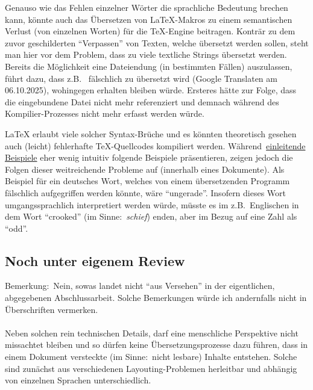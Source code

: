 Genauso wie das Fehlen einzelner Wörter die sprachliche Bedeutung brechen kann, könnte auch das Übersetzen von \LaTeX{}-Makros zu einem semantischen Verlust (von einzelnen Worten) für die \TeX{}-Engine beitragen. Konträr zu dem zuvor geschilderten \enquote{Verpassen} von Texten, welche übersetzt werden sollen, steht man hier vor dem Problem, dass zu viele textliche Strings übersetzt werden. Bereits die Möglichkeit eine Dateiendung (in bestimmten Fällen) auszulassen, führt dazu, dass z.B.\ \verb|| fälschlich zu \verb|| übersetzt wird (Google Translaten am 06.10.2025), wohingegen \verb|| erhalten bleiben würde. Ersteres hätte zur Folge, dass die eingebundene Datei nicht mehr referenziert und demnach während des Kompilier-Prozesses nicht mehr erfasst werden würde.\\\noindent 

\LaTeX{} erlaubt viele solcher Syntax-Brüche und es könnten theoretisch gesehen auch (leicht) fehlerhafte \TeX{}-Quellcodes kompiliert werden. Während~\hyperref[einleitung:hintergrund]{einleitende Beispiele} eher wenig intuitiv folgende Beispiele präsentieren, zeigen jedoch die Folgen dieser weitreichende Probleme auf (innerhalb eines Dokumente). Als Beispiel für ein deutsches Wort, welches von einem übersetzenden Programm fälschlich aufgegriffen werden könnte, wäre \enquote{ungerade}. Insofern dieses Wort umgangssprachlich interpretiert werden würde, müsste es im z.B.\ Englischen in dem Wort \enquote{crooked} (im Sinne:\ \textit{schief}) enden, aber im Bezug auf eine Zahl als \enquote{odd}.\\\noindent


\subsection{Noch unter eigenem Review}
Bemerkung:\ Nein, sowas landet nicht \enquote{aus Versehen} in der eigentlichen, abgegebenen Abschlussarbeit. Solche Bemerkungen würde ich andernfalls nicht in Überschriften vermerken.\\\\

Neben solchen rein technischen Details, darf eine menschliche Perspektive nicht missachtet bleiben und so dürfen keine Übersetzungsprozesse dazu führen, dass in einem Dokument versteckte (im Sinne:\ nicht lesbare) Inhalte entstehen. Solche sind zunächst aus verschiedenen Layouting-Problemen herleitbar und abhängig von einzelnen Sprachen unterschiedlich. 


